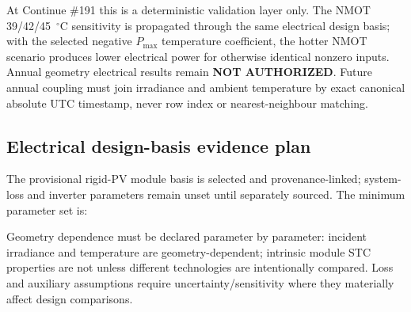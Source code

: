 \documentclass[11pt,a4paper]{article}
\begin{document}
At Continue \#191 this is a deterministic validation layer only. The NMOT 39/42/45~$^{\circ}$C sensitivity is propagated through the same electrical design basis; with the selected negative $P_{\max}$ temperature coefficient, the hotter NMOT scenario produces lower electrical power for otherwise identical nonzero inputs. Annual geometry electrical results remain \textbf{NOT AUTHORIZED}. Future annual coupling must join irradiance and ambient temperature by exact canonical absolute UTC timestamp, never row index or nearest-neighbour matching.

\subsection{Electrical design-basis evidence plan}
The provisional rigid-PV module basis is selected and provenance-linked; system-loss and inverter parameters remain unset until separately sourced. The minimum parameter set is:
\begin{center}\end{center}
Geometry dependence must be declared parameter by parameter: incident irradiance and temperature are geometry-dependent; intrinsic module STC properties are not unless different technologies are intentionally compared. Loss and auxiliary assumptions require uncertainty/sensitivity where they materially affect design comparisons.
\end{document}
